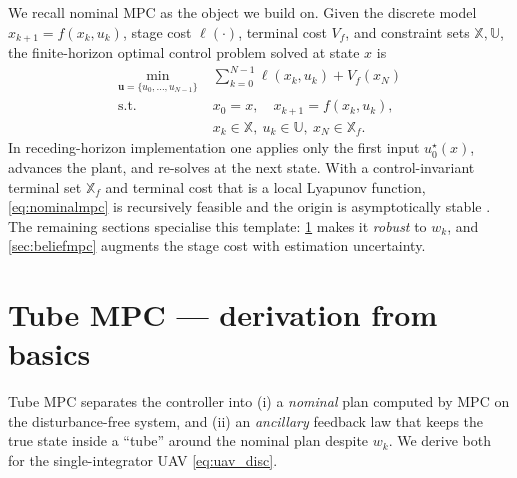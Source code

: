 \documentclass[11pt]{article}
\newcommand{\Xset}{\mathbb{X}}
\newcommand{\Uset}{\mathbb{U}}
\begin{document}
We recall nominal MPC \citep{mayne2000constrained,rawlings2017model} as the object we build on. Given the
discrete model $x_{k+1}=f(x_k,u_k)$, stage cost $\ell(\cdot)$, terminal cost $V_f$, and constraint sets
$\Xset,\Uset$, the finite-horizon optimal control problem solved at state $x$ is
\begin{equation}
\begin{aligned}
\min_{\mathbf{u}=\{u_0,\dots,u_{N-1}\}}\;
& \sum_{k=0}^{N-1}\ell(x_k,u_k) + V_f(x_N)\\
\text{s.t.}\quad & x_0 = x,\quad x_{k+1}=f(x_k,u_k),\\
& x_k\in\Xset,\ u_k\in\Uset,\ x_N\in\Xset_f .
\end{aligned}
\label{eq:nominalmpc}
\end{equation}
In receding-horizon implementation one applies only the first input $u_0^\star(x)$, advances the plant, and
re-solves at the next state. With a control-invariant terminal set $\Xset_f$ and terminal cost that is a local
Lyapunov function, \cref{eq:nominalmpc} is recursively feasible and the origin is asymptotically stable
\citep[Thm.~2.19]{rawlings2017model}. The remaining sections specialise this template: \cref{sec:tube} makes
it \emph{robust} to $w_k$, and \cref{sec:beliefmpc} augments the stage cost with estimation uncertainty.

\section{Tube MPC --- derivation from basics}
\label{sec:tube}

Tube MPC \citep{mayne2005robust} separates the controller into (i) a \emph{nominal} plan computed by MPC on
the disturbance-free system, and (ii) an \emph{ancillary} feedback law that keeps the true state inside a
``tube'' around the nominal plan despite $w_k$. We derive both for the single-integrator UAV
\cref{eq:uav_disc}.
\end{document}
